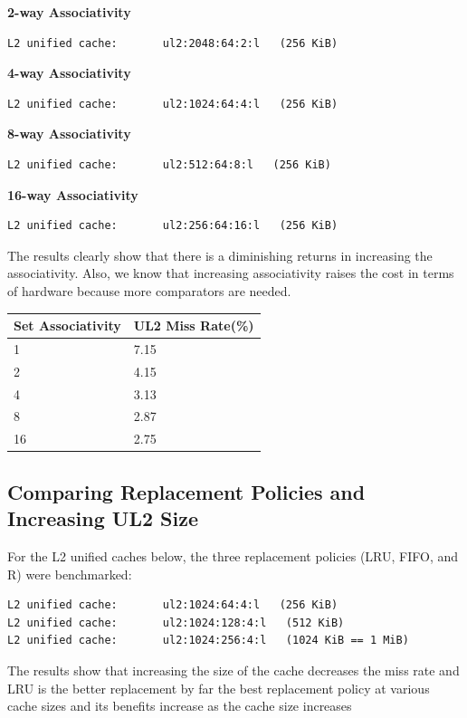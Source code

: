 \documentclass[twocolumn]{article}
\begin{document}
\textbf{2-way Associativity}
\begin{lstlisting}
L2 unified cache:       ul2:2048:64:2:l   (256 KiB)
\end{lstlisting}

\textbf{4-way Associativity}
\begin{lstlisting}
L2 unified cache:       ul2:1024:64:4:l   (256 KiB)
\end{lstlisting}

\textbf{8-way Associativity}
\begin{lstlisting}
L2 unified cache:       ul2:512:64:8:l   (256 KiB)
\end{lstlisting}

\textbf{16-way Associativity}
\begin{lstlisting}
L2 unified cache:       ul2:256:64:16:l   (256 KiB)
\end{lstlisting}
\medskip
The results clearly show that there is a diminishing returns in increasing the associativity. Also, we know that increasing associativity raises the cost in terms of hardware because more comparators are needed.\\

\begingroup
    \medskip
    \centering
    \def\arraystretch{1.5}
        \scriptsize{
        \begin{tabular}{ll}
            \toprule
            Set Associativity & UL2 Miss Rate(\%) \\
             \midrule
            1 & 7.15\\
            2 & 4.15\\
            4 & 3.13\\
            8 & 2.87\\
            16 & 2.75\\
            \bottomrule
        \end{tabular}
        }
    \label{fig:noOptimization}
    \medskip
\endgroup

\subsection{Comparing Replacement Policies and Increasing UL2 Size}

For the L2 unified caches below, the three replacement policies (LRU, FIFO, and R) were benchmarked:

\begin{lstlisting}
L2 unified cache:       ul2:1024:64:4:l   (256 KiB)
L2 unified cache:       ul2:1024:128:4:l   (512 KiB)
L2 unified cache:       ul2:1024:256:4:l   (1024 KiB == 1 MiB)
\end{lstlisting}
\medskip
The results show that increasing the size of the cache decreases the miss rate and LRU is the better replacement by far the best replacement policy at various cache sizes and its benefits increase as the cache size increases\\
\end{document}
